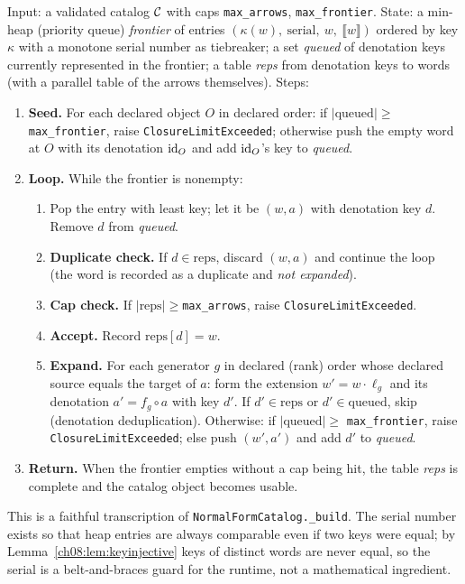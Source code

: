 \begin{algorithm}\label{ch08:alg:closure}
Input: a validated catalog $\mathcal{C}$ with caps \texttt{max\_arrows},
\texttt{max\_frontier}. State: a min-heap (priority queue) \emph{frontier}
of entries $(\kappa(w),\ \text{serial},\ w,\ \llbracket w\rrbracket)$
ordered by key $\kappa$ with a monotone serial number as tiebreaker; a set
\emph{queued} of denotation keys currently represented in the frontier; a
table \emph{reps} from denotation keys to words (with a parallel table of
the arrows themselves). Steps:
\begin{enumerate}
\item \textbf{Seed.} For each declared object $O$ in declared order: if
  $|\text{queued}|\ge{}$\texttt{max\_frontier}, raise
  \texttt{ClosureLimitExceeded}; otherwise push the empty word at $O$ with
  its denotation $\mathrm{id}_O$ and add $\mathrm{id}_O$'s key to \emph{queued}.
\item \textbf{Loop.} While the frontier is nonempty:
  \begin{enumerate}
  \item Pop the entry with least key; let it be $(w,a)$ with denotation key
    $d$. Remove $d$ from \emph{queued}.
  \item \textbf{Duplicate check.} If $d\in\text{reps}$, discard $(w,a)$ and
    continue the loop (the word is recorded as a duplicate and \emph{not
    expanded}).
  \item \textbf{Cap check.} If $|\text{reps}|\ge{}$\texttt{max\_arrows},
    raise \texttt{ClosureLimitExceeded}.
  \item \textbf{Accept.} Record $\text{reps}[d]=w$.
  \item \textbf{Expand.} For each generator $g$ in declared (rank) order
    whose declared source equals the target of $a$: form the extension
    $w'=w\cdot\ell_g$ and its denotation $a'=f_g\circ a$ with key $d'$. If
    $d'\in\text{reps}$ or $d'\in\text{queued}$, skip (denotation
    deduplication). Otherwise: if $|\text{queued}|\ge{}$%
    \texttt{max\_frontier}, raise \texttt{ClosureLimitExceeded}; else push
    $(w',a')$ and add $d'$ to \emph{queued}.
  \end{enumerate}
\item \textbf{Return.} When the frontier empties without a cap being hit,
  the table \emph{reps} is complete and the catalog object becomes usable.
\end{enumerate}
This is a faithful transcription of \texttt{NormalFormCatalog.\_build}. The
serial number exists so that heap entries are always comparable even if two
keys were equal; by Lemma~\ref{ch08:lem:keyinjective} keys of distinct words
are never equal, so the serial is a belt-and-braces guard for the runtime,
not a mathematical ingredient.
\end{algorithm}

